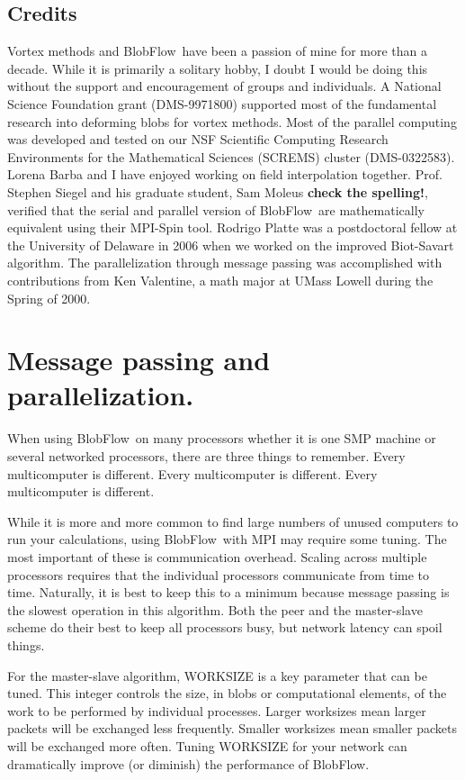 \documentclass[12pt]{report}
\newcommand{\BF}{BlobFlow}
\begin{document}
\section{Credits}

Vortex methods and \BF~have been a passion of mine for more than a decade. 
While it is primarily a solitary hobby, I doubt I would be doing this without
the support and encouragement of groups and individuals.  A National Science
Foundation grant (DMS-9971800) supported most of the fundamental research into
deforming blobs for vortex methods.  Most of the parallel computing was
developed and tested on our NSF Scientific Computing Research Environments
for the Mathematical Sciences (SCREMS) cluster (DMS-0322583). Lorena Barba and I
have enjoyed working on field interpolation together.
Prof. Stephen Siegel and his graduate student, Sam Moleus {\bf check the
spelling!}, verified that the serial and parallel version of \BF~are
mathematically equivalent using their MPI-Spin tool. Rodrigo Platte was a
postdoctoral fellow at the University of Delaware in 2006 when we worked on the
improved Biot-Savart algorithm.  The parallelization through message passing was
accomplished with
contributions from Ken Valentine, a math major at UMass Lowell
during the Spring of 2000.




\appendix

\chapter{Message passing and parallelization.}

When using \BF~on many processors whether it is one SMP machine or
several networked processors, there are three things to remember. Every
multicomputer is different. Every multicomputer is different. Every
multicomputer is different.  

While it is more and more common to find large numbers of unused computers to
run your calculations, using \BF~with MPI may require some tuning.
The most important of these is communication overhead.  Scaling across
multiple processors requires that the individual processors communicate from
time to time.  Naturally, it is best to keep this to a minimum because
message passing is the slowest operation in this algorithm.  
Both the peer and the master-slave scheme do their best to keep all
processors busy, but network latency can spoil things.

For the master-slave algorithm, WORKSIZE is a key parameter that can be
tuned.  This integer controls the size, in blobs or computational elements,
of the work to be performed by individual processes.  Larger worksizes mean
larger packets will be exchanged less frequently.  Smaller worksizes mean
smaller packets will be exchanged more often.  Tuning WORKSIZE for your
network can dramatically improve (or diminish) the performance of \BF.
\end{document}

